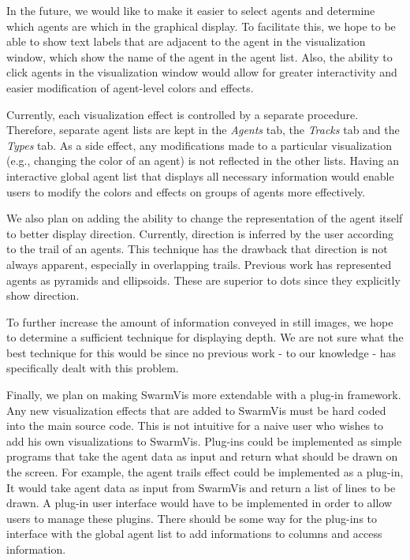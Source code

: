 \documentclass[conference]{IEEEtran}
\begin{document}
In the future, we would like to make it easier to select agents and determine which agents are which in the graphical display.
To facilitate this, we hope to be able to show text labels that are adjacent to the agent in the visualization window, which
show the name of the agent in the agent list.
Also, the ability to click agents in the visualization window would allow for greater
interactivity and easier modification of agent-level colors and effects.

Currently, each visualization effect is controlled by a separate procedure.
Therefore, separate agent lists are kept in the \textit{Agents} tab, the \textit{Tracks} tab and the \textit{Types} tab.
As a side effect, any modifications made to a particular visualization (e.g., changing the color of an agent) is not reflected in the other lists.
Having an interactive global agent list that displays all necessary information would enable users to modify
the colors and effects on groups of agents more effectively. 

We also plan on adding the ability to change the representation of the agent itself to better display direction.
Currently, direction is inferred by the user according to the trail of an agents. This technique has the drawback that direction is not always apparent, especially in overlapping trails.
Previous work has represented agents as 
pyramids\cite{spector2005ecb}  and ellipsoids\cite{10.1109/TVCG.2005.87}.
These are superior to dots since they explicitly show direction.

To further increase the amount of information conveyed in still images,
we hope to determine a sufficient technique for displaying depth.
We are not sure what the best technique for this would be since no previous work - to our knowledge - has specifically dealt with this problem.

Finally, we plan on making SwarmVis more extendable with a plug-in framework.
Any new visualization effects that are added to SwarmVis must be hard coded into the main source code.
This is not intuitive for a naive user who wishes to add his own visualizations to SwarmVis.
Plug-ins could be implemented as simple programs that take the agent data as input and return
what should be drawn on the screen. For example, the agent trails effect could be implemented as a plug-in,
It would take agent data as input from SwarmVis and return a list of lines to be drawn.
A plug-in user interface would have to be implemented in order to allow users to manage these plugins.
There should be some way for the plug-ins to interface with the global agent list to add informations to columns
and access information.
\end{document}
